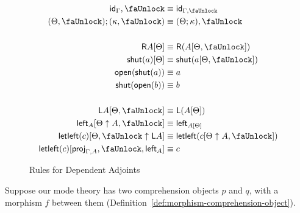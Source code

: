 \documentclass[10pt]{article}
\theoremstyle{definition}
\newcommand{\CTX}{\,\,\mathsf{Ctx}}
\newcommand{\TYPE}{\,\,\mathsf{Type}}
\newcommand{\id}{\mathsf{id}}
\newcommand{\qyields}{\Vdash}
\newcommand\proj[1]{\ensuremath{\mathsf{proj}_{#1}}}
\newcommand{\lock}{\text{\faUnlock}}
\newcommand{\Rtype}[1]{\mathsf{R}{#1}}
\newcommand{\RI}[1]{\mathsf{shut}({#1})}
\newcommand{\RE}[1]{\mathsf{open}({#1})}
\newcommand{\Ltype}[1]{\mathsf{L}{#1}}
\newcommand{\LI}[1]{\mathsf{left}_{#1}}
\newcommand{\LE}[1]{\mathsf{letleft}({#1})}
\begin{document}
\begin{figure}
\begin{align}
\id_\Gamma , \lock &\equiv \id_{\Gamma, \lock} \\
(\Theta, \lock) ; (\kappa, \lock) &\equiv (\Theta ; \kappa), \lock \\
\nonumber \\
\Rtype{A}[\Theta] &\equiv \Rtype{(A[\Theta, \lock])} \\
\RI{a}[\Theta] &\equiv \RI{a[\Theta, \lock]} \\
\RE{\RI{a}} &\equiv a \\
\RI{\RE{b}} &\equiv b \\
\nonumber \\
\Ltype{A}[\Theta, \lock] &\equiv \Ltype{(A[\Theta])} \\
\LI{A}[\Theta \uparrow A, \lock] &\equiv \LI{A[\Theta]} \\
\LE{c}[\Theta, \lock \uparrow \Ltype{A}] &\equiv \LE{c[\Theta \uparrow A, \lock]} \\
\LE{c}[\proj{\Gamma, A}, \lock, \LI{A}] &\equiv c
\end{align}
\caption{Rules for Dependent Adjoints}\label{fig:qit-adjoint-rules}
\end{figure}

Suppose our mode theory has two comprehension objects $p$ and $q$, with a morphism $f$ between them (Definition~\ref{def:morphism-comprehension-object}). 
\end{document}
